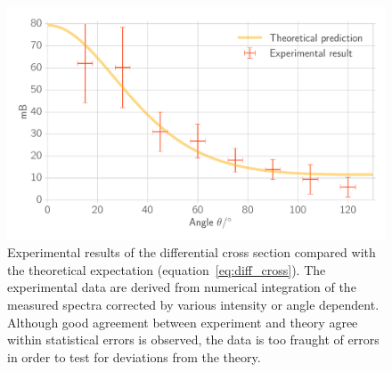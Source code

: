 \begin{figure}[htpb]
    \centering
    \includegraphics[width=0.9\linewidth]{./analysis/figures/na_cross_section}
    \caption{Experimental results of the differential cross section compared with the theoretical expectation 
        (equation~\eqref{eq:diff_cross}). The experimental data are derived from numerical integration of the measured spectra corrected
        by various intensity or angle dependent. Although good agreement between experiment and theory agree within statistical errors is
        observed, the data is too fraught of errors in order to test for deviations from the theory.}
\label{fig:na_cross_section}
\end{figure}
\newpage
